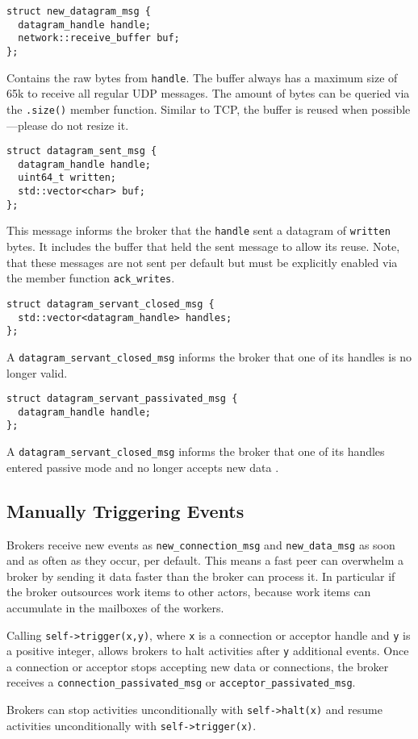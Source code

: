 \begin{lstlisting}
struct new_datagram_msg {
  datagram_handle handle;
  network::receive_buffer buf;
};
\end{lstlisting}

Contains the raw bytes from \lstinline^handle^. The buffer always has a maximum
size of 65k to receive all regular UDP messages. The amount of bytes can be
queried via the \lstinline^.size()^ member function. Similar to TCP, the buffer
is reused when possible---please do not resize it.

\begin{lstlisting}
struct datagram_sent_msg {
  datagram_handle handle;
  uint64_t written;
  std::vector<char> buf;
};
\end{lstlisting}

This message informs the broker that the \lstinline^handle^ sent a datagram of
\lstinline^written^ bytes. It includes the buffer that held the sent message to
allow its reuse. Note, that these messages are not sent per default but must be
explicitly enabled via the member function \lstinline^ack_writes^.

\begin{lstlisting}
struct datagram_servant_closed_msg {
  std::vector<datagram_handle> handles;
};
\end{lstlisting}

A \lstinline^datagram_servant_closed_msg^ informs the broker that one of its
handles is no longer valid.

\begin{lstlisting}
struct datagram_servant_passivated_msg {
  datagram_handle handle;
};
\end{lstlisting}

A \lstinline^datagram_servant_closed_msg^ informs the broker that one of its
handles entered passive mode and no longer accepts new data .

\subsection{Manually Triggering Events \experimental}
\label{trigger}

Brokers receive new events as \lstinline^new_connection_msg^ and
\lstinline^new_data_msg^ as soon and as often as they occur, per default. This
means a fast peer can overwhelm a broker by sending it data faster than the
broker can process it. In particular if the broker outsources work items to
other actors, because work items can accumulate in the mailboxes of the
workers.

Calling \lstinline^self->trigger(x,y)^, where \lstinline^x^ is a connection or
acceptor handle and \lstinline^y^ is a positive integer, allows brokers to halt
activities after \lstinline^y^ additional events. Once a connection or acceptor
stops accepting new data or connections, the broker receives a
\lstinline^connection_passivated_msg^ or \lstinline^acceptor_passivated_msg^.

Brokers can stop activities unconditionally with \lstinline^self->halt(x)^ and
resume activities unconditionally with \lstinline^self->trigger(x)^.
